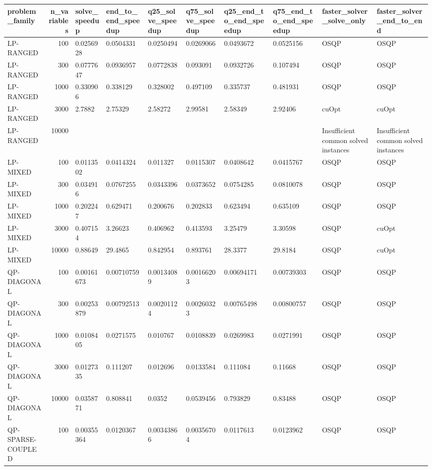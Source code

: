\begin{table}
\label{tab:speedup}
\begin{tabular}{lrllllllll}
\toprule
problem\_family & n\_variables & solve\_speedup & end\_to\_end\_speedup & q25\_solve\_speedup & q75\_solve\_speedup & q25\_end\_to\_end\_speedup & q75\_end\_to\_end\_speedup & faster\_solver\_solve\_only & faster\_solver\_end\_to\_end \\
\midrule
LP-RANGED & 100 & 0.0256928 & 0.0504331 & 0.0250494 & 0.0269066 & 0.0493672 & 0.0525156 & OSQP & OSQP \\
LP-RANGED & 300 & 0.0777647 & 0.0936957 & 0.0772838 & 0.093091 & 0.0932726 & 0.107494 & OSQP & OSQP \\
LP-RANGED & 1000 & 0.330906 & 0.338129 & 0.328002 & 0.497109 & 0.335737 & 0.481931 & OSQP & OSQP \\
LP-RANGED & 3000 & 2.7882 & 2.75329 & 2.58272 & 2.99581 & 2.58349 & 2.92406 & cuOpt & cuOpt \\
LP-RANGED & 10000 &  &  &  &  &  &  & Insufficient common solved instances & Insufficient common solved instances \\
LP-MIXED & 100 & 0.0113502 & 0.0414324 & 0.011327 & 0.0115307 & 0.0408642 & 0.0415767 & OSQP & OSQP \\
LP-MIXED & 300 & 0.034916 & 0.0767255 & 0.0343396 & 0.0373652 & 0.0754285 & 0.0810078 & OSQP & OSQP \\
LP-MIXED & 1000 & 0.202247 & 0.629471 & 0.200676 & 0.202833 & 0.623494 & 0.635109 & OSQP & OSQP \\
LP-MIXED & 3000 & 0.407154 & 3.26623 & 0.406962 & 0.413593 & 3.25479 & 3.30598 & OSQP & cuOpt \\
LP-MIXED & 10000 & 0.88649 & 29.4865 & 0.842954 & 0.893761 & 28.3377 & 29.8184 & OSQP & cuOpt \\
QP-DIAGONAL & 100 & 0.00161673 & 0.00710759 & 0.00134089 & 0.00166203 & 0.00694171 & 0.00739303 & OSQP & OSQP \\
QP-DIAGONAL & 300 & 0.00253879 & 0.00792513 & 0.00201124 & 0.00260323 & 0.00765498 & 0.00800757 & OSQP & OSQP \\
QP-DIAGONAL & 1000 & 0.0108405 & 0.0271575 & 0.010767 & 0.0108839 & 0.0269983 & 0.0271991 & OSQP & OSQP \\
QP-DIAGONAL & 3000 & 0.0127335 & 0.111207 & 0.012696 & 0.0133584 & 0.111084 & 0.11668 & OSQP & OSQP \\
QP-DIAGONAL & 10000 & 0.0358771 & 0.808841 & 0.0352 & 0.0539456 & 0.793829 & 0.83488 & OSQP & OSQP \\
QP-SPARSE-COUPLED & 100 & 0.00355364 & 0.0120367 & 0.00343866 & 0.00356704 & 0.0117613 & 0.0123962 & OSQP & OSQP \\

\end{tabular}
\end{table}
